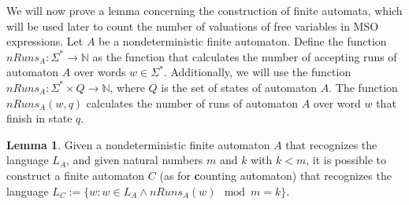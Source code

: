 \documentclass[en]{pracamgr}
\theoremstyle{definition}
\newtheorem{lemma}[theorem]{Lemma}
\begin{document}
We will now prove a lemma concerning the construction of finite automata, which will be used later to count the number of valuations of free variables in MSO expressions. Let $A$ be a nondeterministic finite automaton. Define the function $nRuns_A : \Sigma^* \rightarrow \mathbb{N}$ as the function that calculates the number of accepting runs of automaton $A$ over words $w \in \Sigma^*$. Additionally, we will use the function $nRuns_A : \Sigma^* \times Q \rightarrow \mathbb{N}$, where $Q$ is the set of states of automaton $A$. The function $nRuns_A(w, q)$ calculates the number of runs of automaton $A$ over word $w$ that finish in state $q$.

\begin{lemma}
    \label{CountRunsAutomaton}
    Given a nondeterministic finite automaton $A$ that recognizes the language $L_A$, and given natural numbers $m$ and $k$ with $k < m$, it is possible to construct a finite automaton $C$ (as for \textbf{c}ounting automaton) that recognizes the language $L_{C} := \{ w : w \in L_A \land nRuns_A(w) \mod m = k \}$.
\end{lemma}
\end{document}
